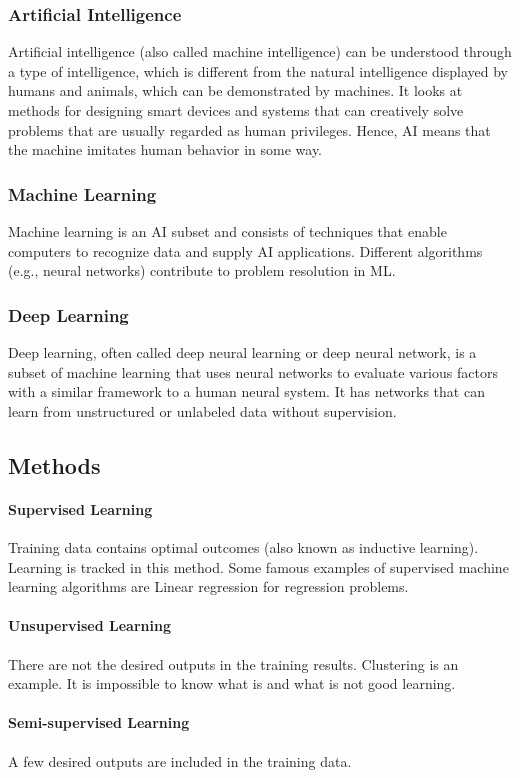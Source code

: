 \subsubsection{Artificial Intelligence}
Artificial intelligence (also called machine intelligence) can be understood through a type of intelligence, which is different from the natural intelligence displayed by humans and animals, which can be demonstrated by machines. It looks at methods for designing smart devices and systems that can creatively solve problems that are usually regarded as human privileges. Hence, AI means that the machine imitates human behavior in some way. 
\subsubsection{Machine Learning} 
Machine learning is an AI subset and consists of techniques that enable computers to recognize data and supply AI applications. Different algorithms (e.g., neural networks) contribute to problem resolution in ML.

\subsubsection{Deep Learning}
Deep learning, often called deep neural learning or deep neural network, is a subset of machine learning that uses neural networks to evaluate various factors with a similar framework to a human neural system. It has networks that can learn from unstructured or unlabeled data without supervision.

\subsection{Methods}
\paragraph{Supervised Learning}
Training data contains optimal outcomes (also known as inductive learning). Learning is tracked in this method. Some famous examples of supervised machine learning algorithms are Linear regression for regression problems. 
\paragraph{Unsupervised Learning} 
There are not the desired outputs in the training results. Clustering is an example. It is impossible to know what is and what is not good learning.
\paragraph{Semi-supervised Learning}
A few desired outputs are included in the training data.

